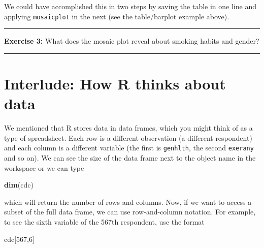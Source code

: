 \documentclass[]{book}
\newenvironment{Shaded}{\begin{snugshade}}{\end{snugshade}}
\newcommand{\KeywordTok}[1]{\textcolor[rgb]{0.13,0.29,0.53}{\textbf{#1}}}
\newcommand{\DecValTok}[1]{\textcolor[rgb]{0.00,0.00,0.81}{#1}}
\newcommand{\OperatorTok}[1]{\textcolor[rgb]{0.81,0.36,0.00}{\textbf{#1}}}
\newcommand{\NormalTok}[1]{#1}
\theoremstyle{definition}
\theoremstyle{definition}
\theoremstyle{definition}
\theoremstyle{remark}
\begin{document}
\begin{Shaded}
\end{Shaded}

We could have accomplished this in two steps by saving the table in one
line and applying \texttt{mosaicplot} in the next (see the table/barplot
example above).

\begin{center}\rule{0.5\linewidth}{\linethickness}\end{center}

\textbf{Exercise 3:} What does the mosaic plot reveal about smoking
habits and gender?

\begin{center}\rule{0.5\linewidth}{\linethickness}\end{center}

\section{Interlude: How R thinks about
data}\label{interlude-how-r-thinks-about-data}

We mentioned that R stores data in data frames, which you might think of
as a type of spreadsheet. Each row is a different observation (a
different respondent) and each column is a different variable (the first
is \texttt{genhlth}, the second \texttt{exerany} and so on). We can see
the size of the data frame next to the object name in the workspace or
we can type

\begin{Shaded}
\begin{Highlighting}[]
\KeywordTok{dim}\NormalTok{(cdc)}
\end{Highlighting}
\end{Shaded}

which will return the number of rows and columns. Now, if we want to
access a subset of the full data frame, we can use row-and-column
notation. For example, to see the sixth variable of the 567th
respondent, use the format

\begin{Shaded}
\begin{Highlighting}[]
\NormalTok{cdc[}\DecValTok{567}\NormalTok{,}\DecValTok{6}\NormalTok{]}
\end{Highlighting}
\end{Shaded}
\end{document}
